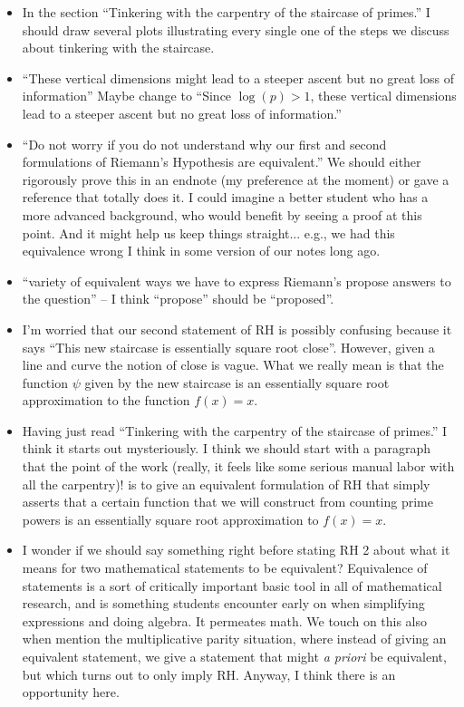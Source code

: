 \documentclass{article}
\begin{document}
\begin{itemize}
\item In the section ``Tinkering with the carpentry of the staircase
  of primes.''  I should draw several plots illustrating every single
  one of the steps we discuss about tinkering with the staircase.

\item ``These vertical dimensions might lead to a steeper ascent but
  no great loss of information'' Maybe change to ``Since $\log(p)>1$,
  these vertical dimensions lead to a steeper ascent but no great loss
  of information.''

\item ``Do not worry if you do not understand why our first and second
  formulations of Riemann’s Hypothesis are equivalent.''  We should
  either rigorously prove this in an endnote (my preference at the
  moment) or gave a reference that totally does it.  I could imagine a
  better student who has a more advanced background, who would benefit
  by seeing a proof at this point.  And it might help us keep things
  straight... e.g., we had this equivalence wrong I think in some
  version of our notes long ago.

\item ``variety of equivalent ways we have to express Riemann’s
  propose answers to the question'' -- I think ``propose'' should be
  ``proposed''.

\item I'm worried that our second statement of RH is possibly
  confusing because it says ``This new staircase is essentially square
  root close''.  However, given a line and curve the notion of close
  is vague.  What we really mean is that the function $\psi$ given by
  the new staircase is an essentially square root approximation to the
  function $f(x) = x$.

\item Having just read ``Tinkering with the carpentry of the staircase
  of primes.'' I think it starts out mysteriously.  I think we should
  start with a paragraph that the point of the work (really, it feels
  like some serious manual labor with all the carpentry)! is to give
  an equivalent formulation of RH that simply asserts that a certain
  function that we will construct from counting prime powers is an
  essentially square root approximation to $f(x)=x$.

\item I wonder if we should say something right before stating RH 2
  about what it means for two mathematical statements to be
  equivalent?  Equivalence of statements is a sort of critically
  important basic tool in all of mathematical research, and is
  something students encounter early on when simplifying expressions
  and doing algebra.  It permeates math.  We touch on this also when
  mention the multiplicative parity situation, where instead of giving
  an equivalent statement, we give a statement that might {\em a
    priori} be equivalent, but which turns out to only imply RH.
  Anyway, I think there is an opportunity here.


\end{itemize}
\end{document}
